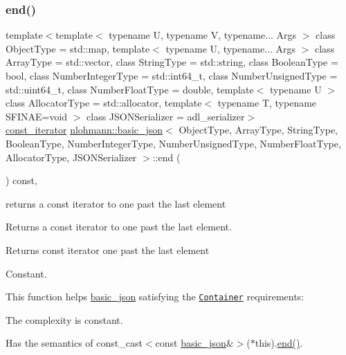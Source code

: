 \subsubsection{\texorpdfstring{end()}{end()}\hspace{0.1cm}{\footnotesize\ttfamily [2/2]}}
{\footnotesize\ttfamily template$<$template$<$ typename U, typename V, typename... Args $>$ class Object\+Type = std\+::map, template$<$ typename U, typename... Args $>$ class Array\+Type = std\+::vector, class String\+Type  = std\+::string, class Boolean\+Type  = bool, class Number\+Integer\+Type  = std\+::int64\+\_\+t, class Number\+Unsigned\+Type  = std\+::uint64\+\_\+t, class Number\+Float\+Type  = double, template$<$ typename U $>$ class Allocator\+Type = std\+::allocator, template$<$ typename T, typename S\+F\+I\+N\+A\+E=void $>$ class J\+S\+O\+N\+Serializer = adl\+\_\+serializer$>$ \\
\mbox{\hyperlink{classnlohmann_1_1basic__json_a41a70cf9993951836d129bb1c2b3126a}{const\+\_\+iterator}} \mbox{\hyperlink{classnlohmann_1_1basic__json}{nlohmann\+::basic\+\_\+json}}$<$ Object\+Type, Array\+Type, String\+Type, Boolean\+Type, Number\+Integer\+Type, Number\+Unsigned\+Type, Number\+Float\+Type, Allocator\+Type, J\+S\+O\+N\+Serializer $>$\+::end (\begin{DoxyParamCaption}{ }\end{DoxyParamCaption}) const\hspace{0.3cm}{\ttfamily [inline]}, {\ttfamily [noexcept]}}



returns a const iterator to one past the last element 

Returns a const iterator to one past the last element.

 \begin{DoxyReturn}{Returns}
const iterator one past the last element
\end{DoxyReturn}
Constant.

This function helps {\ttfamily \mbox{\hyperlink{classnlohmann_1_1basic__json}{basic\+\_\+json}}} satisfying the \href{http://en.cppreference.com/w/cpp/concept/Container}{\tt Container} requirements\+:
\begin{DoxyItemize}
\item The complexity is constant.
\item Has the semantics of {\ttfamily const\+\_\+cast$<$const \mbox{\hyperlink{classnlohmann_1_1basic__json}{basic\+\_\+json}}\&$>$($\ast$this).\mbox{\hyperlink{classnlohmann_1_1basic__json_a13e032a02a7fd8a93fdddc2fcbc4763c}{end()}}}.
\end{DoxyItemize}

